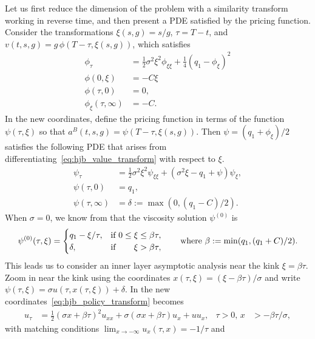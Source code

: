 \documentclass[main.tex]{subfiles}
\begin{document}
Let us first reduce the dimension of the problem with a similarity
transform working in reverse time, and then present a PDE satisfied by the pricing function.
Consider the transformations $\xi(s,g) = s/g$, $\tau=T-t$, and
$v(t,s,g)=g\,\phi(T-\tau,\xi(s,g))$, which satisfies
\begin{align}\label{eq:hjb_value_transform}
  \phi_\tau &= \frac{1}{2}\sigma^2\xi^2\phi_{\xi\xi} +
              \frac{1}{4}{(q_1 - \phi_\xi)}^2 \\
  \phi(0,\xi) &= -C\xi\\
  \phi(\tau,0)& = 0,\\
  \phi_\xi(\tau,\infty) &= -C.
\end{align}
In the new coordinates, define the pricing function in terms of the
function $\psi(\tau,\xi)$ so that $a^B(t,s,g)=\psi(T-\tau,\xi(s,g))$.
Then $\psi = (q_1+\phi_\xi)/2$ satisfies the following PDE
that arises from differentiating~\eqref{eq:hjb_value_transform} with
respect to $\xi$.
\begin{align}\label{eq:hjb_policy_transform}
  \psi_\tau&= \frac{1}{2}\sigma^2 \xi^2
             \psi_{\xi\xi} +
             (\sigma^2\xi - q_1 + \psi)\psi_\xi,\\
  \psi(\tau,0) &= q_1,\\
  \psi(\tau,\infty) &= \delta:=\max(0,(q_1-C)/2).
\end{align}
When $\sigma=0$, we know from  that
the viscosity solution $\psi^{(0)}$ is
\begin{equation}
  \psi^{(0)}(\tau,\xi)=\begin{cases}
    q_1-\xi/\tau, &\text{if } 0\leq \xi\leq
    \beta \tau,\\
    \delta,&\text{if } \hfill \xi > \beta \tau,
  \end{cases}
  \qquad \textnormal{where } \beta:=\min(q_1,(q_1+C)/2).
\end{equation}
This leads us to consider an inner layer asymptotic analysis near
the kink $\xi = \beta \tau$. Zoom in near the kink using the coordinates
$x(\tau,\xi) = (\xi-\beta \tau)/\sigma$ and write $\psi(\tau,\xi) = \sigma
u(\tau,x(\tau,\xi)) + \delta$. In the new
coordinates~\eqref{eq:hjb_policy_transform} becomes
\begin{align}
  u_\tau %
  &=\frac{1}{2}{(\sigma x + \beta \tau)}^2u_{xx}
    +\sigma (\sigma x+\beta \tau)u_x  %
    + uu_x,&\tau>0,\,x&> -\beta \tau/\sigma,
\end{align}
with matching conditions $\lim_{x \to -\infty} u_x(\tau,x) = -1/\tau$ and
\end{document}
